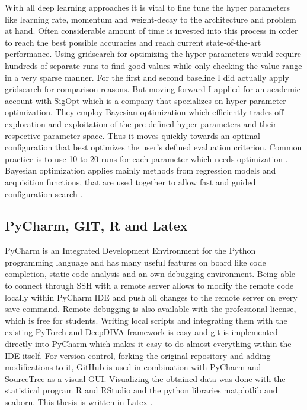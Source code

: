 With all deep learning approaches it is vital to fine tune the hyper parameters like learning rate, momentum and weight-decay to the architecture and problem at hand. Often considerable amount of time is invested into this process in order to reach the best possible accuracies and reach current state-of-the-art performance. Using gridsearch for optimizing the hyper parameters would require hundreds of separate runs to find good values while only checking the value range in a very sparse manner. For the first and second baseline I did actually apply gridsearch for comparison reasons. But moving forward I applied for an academic account with SigOpt \cite{sigopt} which is a company that specializes on hyper parameter optimization. They employ Bayesian optimization which efficiently trades off exploration and exploitation of the pre-defined hyper parameters and their respective parameter space. Thus it moves quickly towards an optimal configuration that best optimizes the user's defined evaluation criterion. Common practice is to use 10 to 20 runs for each parameter which needs optimization \cite{sigoptObservationBudget}. Bayesian optimization applies mainly methods from regression models and acquisition functions, that are used together to allow fast and guided configuration search \cite{sigoptBayesian}.

\subsection{PyCharm, GIT, R and Latex}

PyCharm \cite{PyCharm} is an Integrated Development Environment for the Python programming language and has many useful features on board like code completion, static code analysis and an own debugging environment. Being able to connect through SSH with a remote server allows to modify the remote code locally within PyCharm IDE and push all changes to the remote server on every save command. Remote debugging is also available with the professional license, which is free for students. Writing local scripts and integrating them with the existing PyTorch and DeepDIVA framework is easy and git \cite{git2019} is implemented directly into PyCharm which makes it easy to do almost everything within the IDE itself.
For version control, forking the original repository and adding modifications to it, GitHub \cite{GitHub} is used in combination with PyCharm and SourceTree \cite{SourceTree} as a visual GUI.
Visualizing the obtained data was done with the statistical program R \cite{statR} and RStudio \cite{rstudio} and the python libraries matplotlib and seaborn. This thesis is written in Latex \cite{latexProject2019}.


